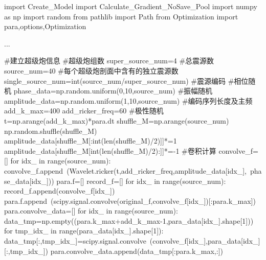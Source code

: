 \documentclass[12pt]{article}
\begin{document}
\begin{python}
import Create_Model
import Calculate_Gradient_NoSave_Pool
import numpy as np
import random
from pathlib import Path
from Optimization import para,options,Optimization

...

#建立超级炮信息
#超级炮组数
super_source_num=4
#总震源数
source_num=40
#每个超级炮剖面中含有的独立震源数
single_source_num=int(source_num/super_source_num)        
#震源编码
#相位随机
phase_data=np.random.uniform(0,10,source_num)
#振幅随机
amplitude_data=np.random.uniform(1,10,source_num)
#编码序列长度及主频
add_k_max=400
add_ricker_freq=60
#极性随机
t=np.arange(add_k_max)*para.dt
shuffle_M=np.arange(source_num)
np.random.shuffle(shuffle_M)
amplitude_data[shuffle_M[:int(len(shuffle_M)/2)]]*=1
amplitude_data[shuffle_M[int(len(shuffle_M)/2):]]*=-1
#卷积计算
convolve_f=[]
for idx_ in range(source_num):
    convolve_f.append\
    (Wavelet.ricker(t,add_ricker_freq,amplitude_data[idx_],\
    phase_data[idx_]))   
para.f=[]
record_f=[]
for idx_ in range(source_num):
    record_f.append(convolve_f[idx_])
    para.f.append\
    (scipy.signal.convolve(original_f,convolve_f[idx_])[:para.k_max])
para.convolve_data=[]
for idx_ in range(source_num):
    data_tmp=np.empty((para.k_max+add_k_max-1,para_data[idx_].shape[1]))
    for tmp_idx_ in range(para_data[idx_].shape[1]):
        data_tmp[:,tmp_idx_]=scipy.signal.convolve\
        (convolve_f[idx_],para_data[idx_][:,tmp_idx_])
    para.convolve_data.append(data_tmp[:para.k_max,:])        
            

\end{python}
\end{document}
